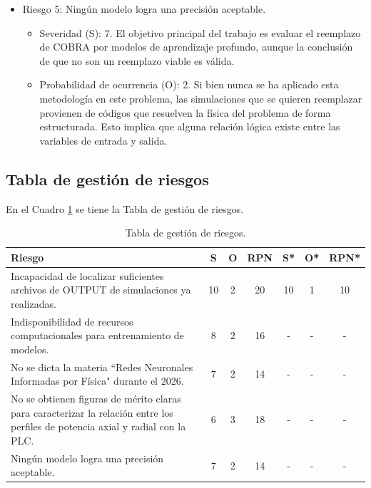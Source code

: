 \documentclass[
11pt, %
]{charter}
\begin{document}
\begin{itemize}
    \begin{itemize}
        \item Severidad (S): 6. Uno de los objetivos del trabajo es evaluar si se pueden definir figuras de mérito.
        \item Probabilidad de ocurrencia (O): 3. Se tiene conocimiento de algunas figuras de mérito ya establecidas, por lo que al menos encontrar la relación exacta de ellas puede realizarse. Adicionalmente el trabajo tiene por objetivo la evaluación de nuevas figuras de mérito, que podría no ser posible.
    \end{itemize}
    \item Riesgo 5: Ningún modelo logra una precisión aceptable.
    \begin{itemize}
        \item Severidad (S): 7. El objetivo principal del trabajo es evaluar el reemplazo de COBRA por modelos de aprendizaje profundo, aunque la conclusión de que no son un reemplazo viable es válida.
        \item Probabilidad de ocurrencia (O): 2. Si bien nunca se ha aplicado esta metodología en este problema, las simulaciones que se quieren reemplazar provienen de códigos que resuelven la física del problema de forma estructurada. Esto implica que alguna relación lógica existe entre las variables de entrada y salida.
    \end{itemize}
\end{itemize}

\subsection{Tabla de gestión de riesgos}
En el Cuadro \ref{tab:riesgos} se tiene la Tabla de gestión de riesgos.

\begin{table}[htpb]
\centering
\caption{Tabla de gestión de riesgos.}
\label{tab:riesgos}
\begin{tabularx}{\linewidth}{@{}|X|c|c|c|c|c|c|@{}}
\hline
\rowcolor[HTML]{C0C0C0} 
Riesgo & S & O & RPN & S* & O* & RPN* \\ \hline
Incapacidad de localizar suficientes archivos de OUTPUT de simulaciones ya realizadas. & 10 & 2 & 20 & 10 & 1 & 10    \\ \hline
Indisponibilidad de recursos computacionales para entrenamiento de modelos. & 8 & 2 & 16 & - & - & -    \\ \hline
No se dicta la materia ``Redes Neuronales Informadas por Física" durante el 2026. & 7 & 2 & 14 & - & - & -    \\ \hline
No se obtienen figuras de mérito claras para caracterizar la relación entre los perfiles de potencia axial y radial con la PLC. & 6 & 3 & 18 & - & - & -    \\ \hline
Ningún modelo logra una precisión aceptable. & 7 & 2 & 14 & - & - & -    \\ \hline
\end{tabularx}%
\end{table}
\end{document}
